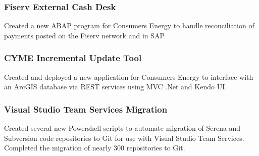 \documentclass{article}
\begin{document}


		\subsubsection{Fiserv External Cash Desk}
			\begin{addmargin}[1em]{0em}
				Created a new ABAP program for Consumers Energy to handle reconciliation of payments posted on the Fiserv network and in SAP.
			\end{addmargin}


    \subsubsection{CYME Incremental Update Tool}
			\begin{addmargin}[1em]{0em}
				Created and deployed a new application for Consumers Energy to interface with an ArcGIS database via REST services using MVC .Net and Kendo UI.
			\end{addmargin}

		\subsubsection{Visual Studio Team Services Migration}
			\begin{addmargin}[1em]{0em}
				Created several new Powershell scripts to automate migration of Serena and Subversion code repositories to Git for use with Visual Studio Team Services. Completed the migration of nearly 300 repositories to Git.
			\end{addmargin}
\end{document}
